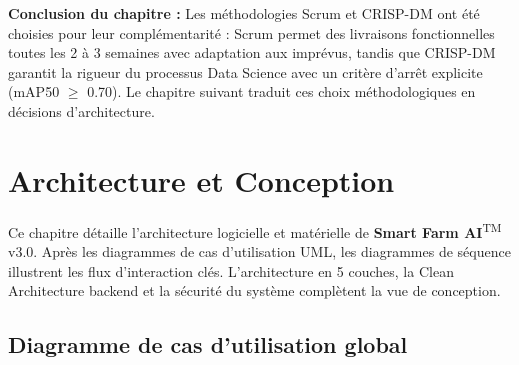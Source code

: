 \documentclass[12pt,a4paper,oneside]{report}
\newcommand{\farmAI}{\textbf{Smart Farm AI}\textsuperscript{TM}}
\begin{document}
\medskip\noindent\textbf{Conclusion du chapitre :} Les méthodologies Scrum et CRISP-DM
ont été choisies pour leur complémentarité : Scrum permet des livraisons fonctionnelles
toutes les 2 à 3 semaines avec adaptation aux imprévus, tandis que CRISP-DM garantit
la rigueur du processus Data Science avec un critère d'arrêt explicite (mAP50 $\geq$ 0.70).
Le chapitre suivant traduit ces choix méthodologiques en décisions d'architecture.

\chapter{Architecture et Conception}

\noindent Ce chapitre détaille l'architecture logicielle et matérielle de \farmAI{} v3.0.
Après les diagrammes de cas d'utilisation UML, les diagrammes de séquence illustrent
les flux d'interaction clés. L'architecture en 5 couches, la Clean Architecture
backend et la sécurité du système complètent la vue de conception.

\section{Diagramme de cas d'utilisation global}
\end{document}
